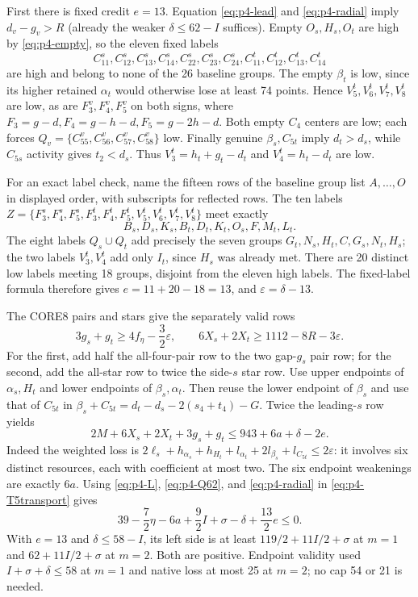 \documentclass[11pt,letterpaper]{article}
\theoremstyle{definition}\newtheorem{definition}[theorem]{Definition}
\begin{document}
First there is fixed credit $e=13$. Equation \eqref{eq:p4-lead} and
\eqref{eq:p4-radial} imply $d_v-g_v>R$ (already the weaker
$\delta\le62-I$ suffices). Empty $O_s,H_s,O_t$ are high by
\eqref{eq:p4-empty}, so the eleven fixed labels
\[
 C^s_{11},C^s_{12},C^s_{13},C^s_{14},C^s_{22},C^s_{23},C^s_{24},
 C^t_{11},C^t_{12},C^t_{13},C^t_{14}
\]
are high and belong to none of the 26 baseline groups.
The empty $\beta_t$ is low, since its higher retained $\alpha_t$ would
otherwise lose at least 74 points. Hence $V^t_5,V^t_6,V^t_7,V^t_8$ are low,
as are $F^v_3,F^v_4,F^v_5$ on both signs, where
$F_3=g-d,F_4=g-h-d,F_5=g-2h-d$.
Both empty $C_4$ centers are low; each forces
$Q_v=\{C^v_{55},C^v_{56},C^v_{57},C^v_{58}\}$ low.
Finally genuine $\beta_s,C_{5t}$ imply $d_t>d_s$, while $C_{5s}$ activity
gives $t_2<d_s$. Thus $V^t_3=h_t+g_t-d_t$ and $V^t_4=h_t-d_t$ are low.

For an exact label check, name the fifteen rows of the baseline group
list $A,\ldots,O$ in displayed order, with subscripts for reflected rows.
The ten labels
$Z=\{F^s_3,F^s_4,F^s_5,F^t_3,F^t_4,F^t_5,V^t_5,V^t_6,V^t_7,V^t_8\}$
meet exactly
\[
 B_s,D_s,K_s,B_t,D_t,K_t,O_s,F,M_t,L_t.
\]
The eight labels $Q_s\cup Q_t$ add precisely the seven groups
$G_t,N_s,H_t,C,G_s,N_t,H_s$; the two labels $V^t_3,V^t_4$ add only $I_t$,
since $H_s$ was already met. There are 20 distinct low labels meeting
18 groups, disjoint from the eleven high labels. The fixed-label formula
therefore gives $e=11+20-18=13$, and $\varepsilon=\delta-13$.

The CORE8 pairs and stars give the separately valid rows
\[
 3g_s+g_t\ge4f_\eta-\frac32\varepsilon,
 \qquad 6X_s+2X_t\ge1112-8R-3\varepsilon.
\]
For the first, add half the all-four-pair row to the two gap-$g_s$ pair
row; for the second, add the all-star row to twice the side-$s$ star row.
Use upper endpoints of $\alpha_s,H_t$ and lower endpoints of
$\beta_s,\alpha_t$. Then reuse the lower endpoint of $\beta_s$ and use
that of $C_{5t}$ in
$\beta_s+C_{5t}=d_t-d_s-2(s_4+t_4)-G$.
Twice the leading-$s$ row yields
\begin{equation}
 2M+6X_s+2X_t+3g_s+g_t\le943+6a+\delta-2e.       \label{eq:p4-T5transport}
\end{equation}
Indeed the weighted loss is
$2\ell_s+h_{\alpha_s}+h_{H_t}+l_{\alpha_t}+2l_{\beta_s}+l_{C_{5t}}
\le2\varepsilon$: it involves six distinct resources, each with coefficient
at most two. The six endpoint weakenings are exactly $6a$.
Using \eqref{eq:p4-L}, \eqref{eq:p4-Q62}, and
\eqref{eq:p4-radial} in \eqref{eq:p4-T5transport} gives
\begin{equation}
 39-\frac72\eta-6a+\frac92I+\sigma-\delta+\frac{13}{2}e\le0.
                                                        \label{eq:p4-T5final}
\end{equation}
With $e=13$ and $\delta\le58-I$, its left side is at least
$119/2+11I/2+\sigma$ at $m=1$ and $62+11I/2+\sigma$ at $m=2$.
Both are positive. Endpoint validity used $I+\sigma+\delta\le58$ at
$m=1$ and native loss at most 25 at $m=2$; no cap 54 or 21 is needed.
\end{document}
